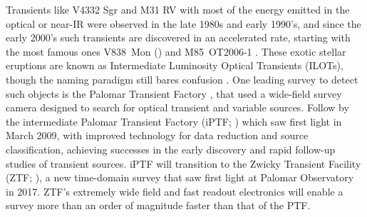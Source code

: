 \documentclass[a4paper,modern]{aastex62}
\begin{document}
Transients like V4332 Sgr \citep{1990ApJ...353L..35M,1999AJ....118.1034M,2018ATel11733....1G} and M31 RV \citep{1990ApJ...353L..35M} with most of the energy emitted in the optical or near-IR were observed in the late 1980s and early 1990's, and since the early 2000's such transients are discovered in an accelerated rate, starting with the most famous ones V838~Mon (\citealt{2002A&A...389L..51M,2006A&A...451..223T}) and
 M85~OT2006-1 \citep{2007Natur.447..458K,2010arXiv1011.1222K}.
These exotic stellar eruptions are known as Intermediate Luminosity Optical Transients (ILOTs), though the naming paradigm still bares confusion \citep{2016RAA....16...99K}.
One leading survey to detect such objects is the Palomar Transient Factory \citep{2009PASP..121.1395L}, that used a wide-field survey camera designed to search for optical transient and variable sources.
Follow by the intermediate Palomar Transient Factory (iPTF; \citealt{2013ATel.4807....1K}) which saw first light in March 2009, with improved technology for data reduction and source classification, achieving successes in the early discovery and rapid follow-up studies of transient sources.
iPTF will transition to the Zwicky Transient Facility (ZTF; \citealt{2014htu..conf...27B}), a new time-domain survey that saw first light at Palomar Observatory in 2017.
ZTF's extremely wide field and fast readout electronics will enable a survey more than an order of magnitude faster than that of the PTF.
\end{document}
